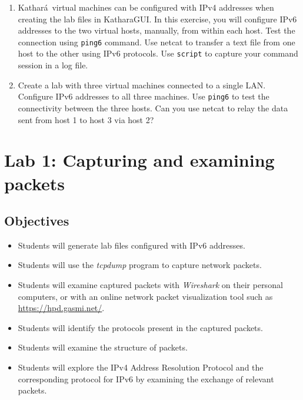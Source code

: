 \documentclass[12pt]{book}
\newcommand{\kathara}{Kathar\'a}
\begin{document}
\begin{enumerate}
\item\label{ipv6.ex} \kathara\ virtual machines can be configured with
  IPv4 addresses 
  when creating the lab files in KatharaGUI. In this exercise, you
  will configure IPv6 addresses to the two virtual hosts, manually,
  from within each host. Test the connection using \verb$ping6$
  command. Use netcat to transfer a text file from one host to the
  other using IPv6 protocols. Use \verb$script$ to capture your
  command session in a log file.

\item Create a lab with three virtual machines connected to a single
  LAN. Configure IPv6 addresses to all three machines. Use
  \verb$ping6$ to test the connectivity between the three hosts. Can
  you use netcat to relay the data sent from host 1 to host 3 via host
  2?
\end{enumerate}



\chapter{Lab 1: Capturing and examining packets }\label{tcpdump.se}

\section{Objectives}

\begin{itemize}[label=--]
  \item Students will generate lab files configured with IPv6
    addresses. 
\item Students will use the \emph{tcpdump} program to capture network
  packets. 
\item Students will examine captured packets with
  \emph{Wireshark} on their personal computers, or with an online
  network packet visualization tool such as
  \url{https://hpd.gasmi.net/}. 
\item Students will identify the protocols
  present in the captured packets. 
\item Students will examine the structure of packets. 
\item Students will explore the IPv4 Address Resolution Protocol and
  the corresponding protocol for IPv6 by examining the exchange of
  relevant packets.

\end{itemize}
\end{document}
